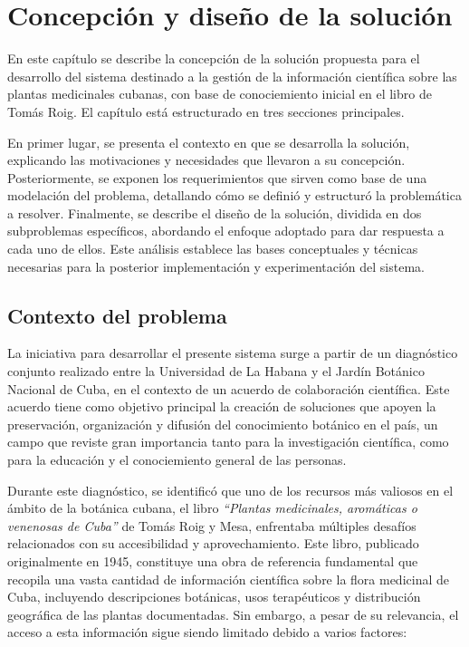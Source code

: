 \chapter{Concepción y diseño de la solución}\label{chapter:solutionDesign}
En este capítulo se describe la concepción de la solución propuesta para el desarrollo 
del sistema destinado a la gestión de la información científica sobre las 
plantas medicinales cubanas, con base de conociemiento inicial en el libro de Tomás Roig. 
El capítulo está estructurado en tres secciones principales.

En primer lugar, se presenta el contexto en que se desarrolla la solución, 
explicando las motivaciones y necesidades que llevaron a su concepción. 
Posteriormente, se exponen los requerimientos que sirven como base de una modelación del problema, 
detallando cómo se definió y estructuró la problemática a resolver. 
Finalmente, se describe el diseño de la solución, dividida en dos subproblemas específicos, 
abordando el enfoque adoptado para dar respuesta a cada uno de ellos. 
Este análisis establece las bases conceptuales y técnicas necesarias para la 
posterior implementación y experimentación del sistema.



\section{Contexto del problema}
La iniciativa para desarrollar el presente sistema surge a partir de un diagnóstico 
conjunto realizado entre la Universidad de La Habana y el Jardín Botánico Nacional de Cuba, 
en el contexto de un acuerdo de colaboración científica. 
Este acuerdo tiene como objetivo principal la creación de soluciones que apoyen 
la preservación, organización y difusión del conocimiento botánico en el país, 
un campo que reviste gran importancia tanto para la investigación científica, 
como para la educación y el conociemiento general de las personas.

Durante este diagnóstico, se identificó que uno de los recursos más valiosos 
en el ámbito de la botánica cubana, el libro \textit{``Plantas medicinales, aromáticas o venenosas de Cuba''} 
de Tomás Roig y Mesa, enfrentaba múltiples desafíos relacionados con su accesibilidad y 
aprovechamiento. Este libro, publicado originalmente en 1945, constituye una obra 
de referencia fundamental que recopila una vasta cantidad de información científica 
sobre la flora medicinal de Cuba, incluyendo descripciones botánicas, 
usos terapéuticos y distribución geográfica de las plantas documentadas. 
Sin embargo, a pesar de su relevancia, el acceso a esta información sigue siendo 
limitado debido a varios factores:

